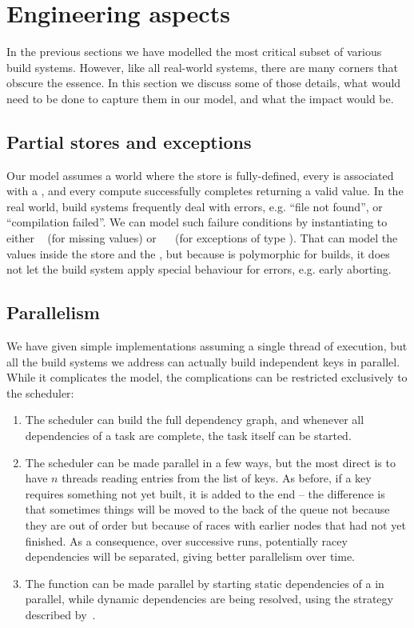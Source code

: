 \section{Engineering aspects}\label{sec-engineering}

In the previous sections we have modelled the most critical subset of various
build systems. However, like all real-world systems, there are many corners that
obscure the essence. In this section we discuss some of those details, what
would need to be done to capture them in our model, and what the impact would be.

\subsection{Partial stores and exceptions}

Our model assumes a world where the store is fully-defined, every  is
associated with a , and every compute successfully completes returning a
valid value. In the real world, build systems frequently deal with errors, e.g.
``file not found'', or ``compilation failed''. We can model such failure
conditions by instantiating  to either ~ (for missing
values) or ~~ (for exceptions of type ). That can
model the values inside the store and the , but because  is
polymorphic for builds, it does not let the build system apply special behaviour
for errors, e.g. early aborting.

\subsection{Parallelism}\label{sec-parallelism}

We have given simple implementations assuming a single thread of execution,
but all the build systems we address can actually build independent keys in parallel.
While it complicates the model, the complications can be restricted exclusively
to the scheduler:

\begin{enumerate}
\item The  scheduler can build the full dependency graph, and
whenever all dependencies of a task are complete, the task itself can be
started.

\item The  scheduler can be made parallel in a few ways, but the
most direct is to have $n$ threads reading entries from the list of keys. As
before, if a key requires something not yet built, it is added to the end -- the
difference is that sometimes things will be moved to the back of the queue not
because they are out of order but because of races with earlier nodes that had
not yet finished. As a consequence, over successive runs, potentially racey
dependencies will be separated, giving better parallelism over time.

\item The  function can be made parallel by starting static
dependencies of a  in parallel, while dynamic dependencies are being
resolved, using the strategy described by~\citet{marlow2014haxl}.
\end{enumerate}

